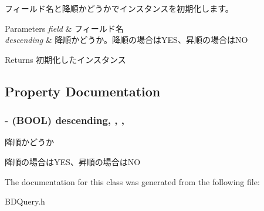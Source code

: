 フィールド名と降順かどうかでインスタンスを初期化します。 


\begin{DoxyParams}{Parameters}
{\em field} & フィールド名 \\
\hline
{\em descending} & 降順かどうか。降順の場合は\-Y\-E\-S、昇順の場合は\-N\-O \\
\hline
\end{DoxyParams}
\begin{DoxyReturn}{Returns}
初期化したインスタンス 
\end{DoxyReturn}


\subsection{Property Documentation}
\hypertarget{interface_b_d_field_order_aa077f2778f44e8a368de24418b111ca5}{
\subsubsection[{descending}]{\setlength{\rightskip}{0pt plus 5cm}-\/ (B\-O\-O\-L) descending\hspace{0.3cm}{\ttfamily [read]}, {\ttfamily [write]}, {\ttfamily [nonatomic]}, {\ttfamily [assign]}}}\label{interface_b_d_field_order_aa077f2778f44e8a368de24418b111ca5}


降順かどうか 

降順の場合は\-Y\-E\-S、昇順の場合は\-N\-O 

The documentation for this class was generated from the following file\-:\begin{DoxyCompactItemize}
\item 
B\-D\-Query.\-h\end{DoxyCompactItemize}

